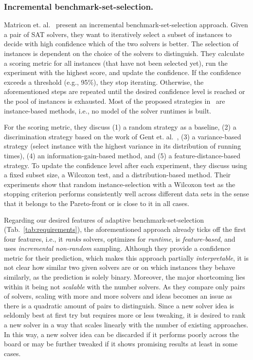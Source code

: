 \documentclass[runningheads]{llncs}
\begin{document}
\subsubsection{Incremental benchmark-set-selection.}
Matricon et. al.~\cite{MatriconAFSH21} present an incremental benchmark-set-selection approach.
Given a pair of SAT solvers, they want to iteratively select a subset of instances to decide with high confidence which of the two solvers is better.
The selection of instances is dependent on the choice of the solvers to distinguish.
They calculate a scoring metric for all instances (that have not been selected yet), run the experiment with the highest score, and update the confidence. If the confidence exceeds a threshold (e.g., 95\%), they stop iterating.
Otherwise, the aforementioned steps are repeated until the desired confidence level is reached or the pool of instances is exhausted.
Most of the proposed strategies in~\cite{MatriconAFSH21} are instance-based methods, i.e., no model of the solver runtimes is built.

For the scoring metric, they discuss (1) a random strategy as a baseline, (2) a discrimination strategy based on the work of Gent et. al.~\cite{GentHJKMNN14}, (3) a variance-based strategy (select instance with the highest variance in its distribution of running times), (4) an information-gain-based method, and (5) a feature-distance-based strategy.
To update the confidence level after each experiment, they discuss using a fixed subset size, a Wilcoxon test, and a distribution-based method. Their experiments show that random instance-selection with a Wilcoxon test as the stopping criterion performs consistently well across different data sets in the sense that it belongs to the Pareto-front or is close to it in all cases.

Regarding our desired features of adaptive benchmark-set-selection (Tab.~\ref{tab:requirements}), the aforementioned approach already ticks off the first four features, i.e., it \textit{ranks} solvers, optimizes for \textit{runtime}, is \textit{feature-based}, and uses \textit{incremental non-random} sampling.
Although they provide a confidence metric for their prediction, which makes this approach partially \textit{interpretable}, it is not clear how similar two given solvers are or on which instances they behave similarly, as the prediction is solely binary.
Moreover, the major shortcoming lies within it being not \textit{scalable} with the number solvers.
As they compare only pairs of solvers, scaling with more and more solvers and ideas becomes an issue as there is a quadratic amount of pairs to distinguish. Since a new solver idea is seldomly best at first try but requires more or less tweaking, it is desired to rank a new solver in a way that scales linearly with the number of existing approaches.
In this way, a new solver idea can be discarded if it performs poorly across the board or may be further tweaked if it shows promising results at least in some cases.
\end{document}
